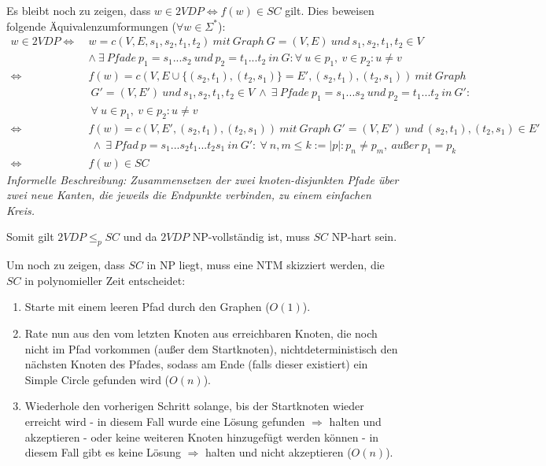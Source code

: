 \begin{teile}
	Es bleibt noch zu zeigen, dass $w \in 2VDP \Leftrightarrow f(w) \in SC$ gilt. Dies beweisen folgende Äquivalenzumformungen ($\forall w \in \Sigma^*$):
	\begin{align*}
		w \in 2VDP \Longleftrightarrow\ &w=c(V,E,s_1,s_2,t_1,t_2)\ mit\ Graph\ G=(V,E)\ und\ s_1,s_2,t_1,t_2 \in V\\
		&\wedge\ \exists\ Pfade\ p_1=s_1...s_2\ und\ p_2=t_1...t_2\ in\ G: \forall\ u \in p_1,\ v \in p_2: u\neq v\\
		\Leftrightarrow\ &f(w)=c(V,E\cup \{(s_2,t_1),(t_2,s_1)\}=E',(s_2,t_1),(t_2,s_1))\ mit\ Graph\\
		&\ G'=(V,E')\ und\ s_1,s_2,t_1,t_2 \in V\ \wedge\ \exists\ Pfade\ p_1=s_1...s_2\ und\ p_2=t_1...t_2\ in\ G':\\
		&\ \forall\ u \in p_1,\ v \in p_2: u\neq v\\
		\Leftrightarrow\ &f(w)=c(V,E',(s_2,t_1),(t_2,s_1))\ mit\ Graph\ G'=(V,E')\ und\ (s_2,t_1),(t_2,s_1) \in E'\\
		&\ \wedge\ \exists\ Pfad\ p=s_1...s_2t_1...t_2s_1\ in\ G':\ \forall\ n,m \leq k:=|p| : p_n\neq p_m,\ außer\ p_1=p_k \\
		\Leftrightarrow\ &f(w) \in SC
	\end{align*}
	\textit{Informelle Beschreibung: Zusammensetzen der zwei knoten-disjunkten Pfade über zwei neue Kanten, die jeweils die Endpunkte verbinden, zu einem einfachen Kreis.}

	Somit gilt $2VDP \leq_p SC$ und da $2VDP$ NP-vollständig ist,  muss $SC$ NP-hart sein.
	
	Um noch zu zeigen, dass $SC$ in NP liegt, muss eine NTM skizziert werden, die $SC$ in polynomieller Zeit entscheidet:
	\begin{enumerate}
		\item Starte mit einem leeren Pfad durch den Graphen ($O(1)$).
		\item Rate nun aus den vom letzten Knoten aus erreichbaren Knoten, die noch nicht im Pfad vorkommen (außer dem Startknoten), nichtdeterministisch den nächsten Knoten des Pfades, sodass am Ende (falls dieser existiert) ein Simple Circle gefunden wird ($O(n)$).
		\item Wiederhole den vorherigen Schritt solange, bis der Startknoten wieder erreicht wird - in diesem Fall wurde eine Lösung gefunden $\Rightarrow$ halten und akzeptieren - oder keine weiteren Knoten hinzugefügt werden können - in diesem Fall gibt es keine Lösung $\Rightarrow$ halten und nicht akzeptieren ($O(n)$).
	\end{enumerate}


\end{teile}
